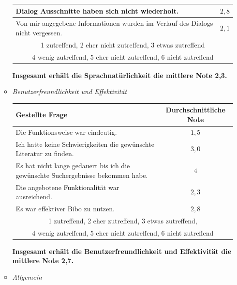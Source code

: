 \documentclass[12pt,a4paper]{scrartcl}
\begin{document}
\begin{enumerate}
\begin{itemize}
\begin{center}
\begin{tabularx}{\linewidth}{|X|r|}
Dialog Ausschnitte haben sich nicht wiederholt. & $2,8$  \\ \hline

Von mir angegebene Informationen wurden im Verlauf des Dialogs nicht vergessen. & $2,1$  \\ \hline
\multicolumn{2}{|c|}{1 zutreffend, 2 eher nicht zutreffend, 3 etwas zutreffend} \\ \hline
\multicolumn{2}{|c|}{4 wenig zutreffend, 5 eher nicht zutreffend, 6 nicht zutreffend} \\ \hline
\end{tabularx}
\end{center}
\textbf{Insgesamt erhält die Sprachnatürlichkeit die mittlere Note 2,3.}
\item \textit{Benutzerfreundlichkeit und Effektivität}
\begin{center}
\begin{tabularx}{\linewidth}{|X|c|}

\hline
Gestellte Frage & Durchschnittliche Note  \\ \hline
Die Funktionsweise war eindeutig. & $1,5$ \\ \hline

Ich hatte keine Schwierigkeiten die gewünschte Literatur zu finden. & $3,0$\\ \hline

Es hat nicht lange gedauert bis ich die gewünschte Suchergebnisse bekommen habe.& $4$\\ \hline

Die angebotene Funktionalität war ausreichend.& $2,3$ \\ \hline

Es war effektiver Bibo zu nutzen. & $2,8$ \\ \hline

\multicolumn{2}{|c|}{1 zutreffend, 2 eher zutreffend, 3 etwas zutreffend,}\\
\multicolumn{2}{|c|}{4 wenig zutreffend, 5 eher nicht zutreffend, 6 nicht zutreffend} \\ \hline

\end{tabularx}
\end{center}
\textbf{Insgesamt erhält die Benutzerfreundlichkeit und Effektivität die mittlere Note 2,7.}

\item \textit{Allgemein}
\begin{center}
\begin{tabularx}{\linewidth}{|X|c|}


\end{tabularx}
\end{center}
\end{itemize}
\end{enumerate}
\end{document}
